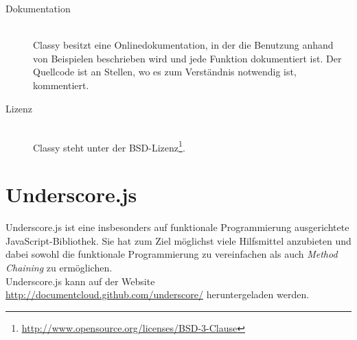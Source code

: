 \begin{description}
\item[Dokumentation] \hfill \\
Classy besitzt eine Onlinedokumentation, in der die Benutzung anhand von Beispielen beschrieben
wird und jede Funktion dokumentiert ist. Der Quellcode ist an Stellen, wo es zum Verständnis
notwendig ist, kommentiert.

\item[Lizenz] \hfill \\
Classy steht unter der
BSD-Lizenz\footnote{\href{http://www.opensource.org/licenses/BSD-3-Clause}{http://www.opensource.org/licenses/BSD-3-Clause}}.
\end{description}





\section{Underscore.js}
Underscore.js ist eine insbesonders auf funktionale Programmierung ausgerichtete
JavaScript-Bibliothek. Sie hat zum Ziel möglichst viele Hilfsmittel anzubieten und dabei sowohl die
funktionale  Programmierung zu vereinfachen als auch \emph{Method Chaining} zu ermöglichen. \\
Underscore.js kann auf der Website
\href{http://documentcloud.github.com/underscore/}{http://documentcloud.github.com/underscore/}
heruntergeladen werden.

